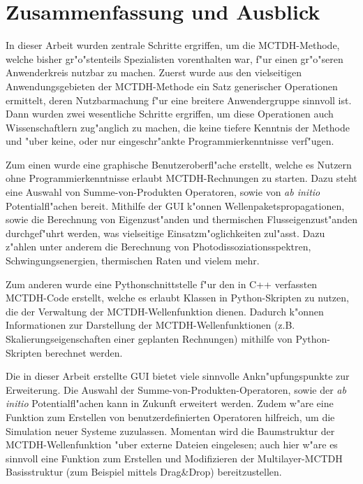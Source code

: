 \chapter{Zusammenfassung und Ausblick}
\label{cha:fazit}

In dieser Arbeit wurden zentrale Schritte ergriffen, um die MCTDH-Methode, welche bisher gr"o"stenteils
Spezialisten vorenthalten war, f"ur einen gr"o"seren Anwenderkreis nutz\-bar zu machen.
Zuerst wurde aus den vielseitigen Anwendungsgebieten der MCTDH-Methode ein Satz generischer
Operationen ermittelt, deren Nutzbarmachung f"ur eine breitere Anwendergruppe sinnvoll ist.
Dann wurden zwei wesentliche Schritte ergriffen, um diese Operationen auch
Wissenschaftlern zug"anglich zu machen, die keine tiefere Kenntnis der Methode und
"uber keine, oder nur eingeschr"ankte Programmierkenntnisse verf"ugen.

Zum einen wurde eine graphische Benutzeroberfl"ache erstellt, welche es Nutzern ohne
Programmierkenntnisse erlaubt MCTDH-Rechnungen zu starten. Dazu steht eine Aus\-wahl
von Summe-von-Produkten Operatoren, sowie von \textit{ab initio} Potentialfl"achen bereit.
Mithilfe der GUI k"onnen Wellenpaketspropagationen, sowie die Berechnung von Eigenzust"anden
und thermischen Flusseigenzust"anden durchgef"uhrt werden, was vielseitige Einsatzm"oglichkeiten
zul"asst. Dazu z"ahlen unter anderem die Berechnung von Photodissoziationsspektren, 
Schwingungsenergien, thermischen Raten und vielem mehr.

Zum anderen wurde eine Pythonschnittstelle f"ur den in C++ verfassten MCTDH-Code erstellt, 
welche es erlaubt Klassen in Python-Skripten zu nutzen, die der Verwaltung der MCTDH-Wellenfunktion dienen. 
Dadurch k"onnen Informationen zur Darstellung der MCTDH-Wellenfunktionen (z.B. Skalierungseigenschaften
einer geplanten Rechnungen) mithilfe von Python-Skripten berechnet werden.

Die in dieser Arbeit erstellte GUI bietet viele sinnvolle Ankn"upfungspunkte zur Erweiterung.
Die Auswahl der Summe-von-Produkten-Operatoren, sowie der \textit{ab initio} Potentialfl"achen kann in Zukunft
erweitert werden. Zudem w"are eine Funktion zum Erstellen von benutzerdefinierten Operatoren
hilfreich, um die Simulation neuer Systeme zuzulassen. Momentan wird die Baumstruktur der MCTDH-Wellenfunk\-tion
"uber externe Dateien eingelesen; auch hier w"are es sinnvoll eine Funktion zum
Erstellen und Modifizieren der Multilayer-MCTDH Basisstruktur (zum Beispiel mit\-tels Drag\&Drop) bereitzustellen.

